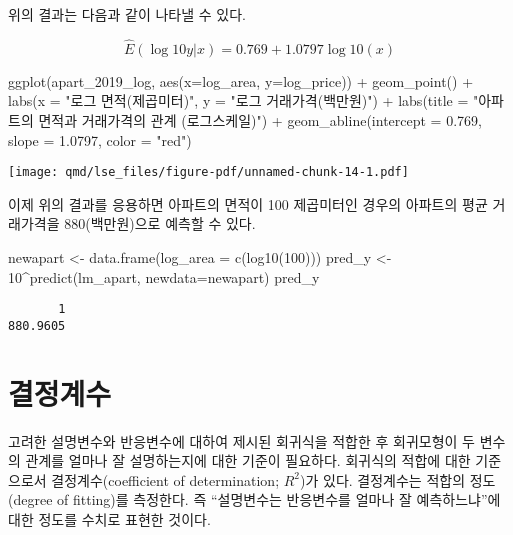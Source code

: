 \documentclass[
  11pt,
  a4paper,
  oneside]{scrbook}
\newenvironment{Shaded}{\begin{snugshade}}{\end{snugshade}}
\newcommand{\AttributeTok}[1]{\textcolor[rgb]{0.40,0.45,0.13}{#1}}
\newcommand{\DecValTok}[1]{\textcolor[rgb]{0.68,0.00,0.00}{#1}}
\newcommand{\FloatTok}[1]{\textcolor[rgb]{0.68,0.00,0.00}{#1}}
\newcommand{\FunctionTok}[1]{\textcolor[rgb]{0.28,0.35,0.67}{#1}}
\newcommand{\NormalTok}[1]{\textcolor[rgb]{0.00,0.23,0.31}{#1}}
\newcommand{\OtherTok}[1]{\textcolor[rgb]{0.00,0.23,0.31}{#1}}
\newcommand{\SpecialCharTok}[1]{\textcolor[rgb]{0.37,0.37,0.37}{#1}}
\newcommand{\StringTok}[1]{\textcolor[rgb]{0.13,0.47,0.30}{#1}}
\theoremstyle{definition}
\theoremstyle{plain}
\theoremstyle{definition}
\theoremstyle{definition}
\theoremstyle{remark}
\begin{document}
위의 결과는 다음과 같이 나타낼 수 있다.

\[ \hat E( \log10 y | x) = 0.769 + 1.0797 \log10 (x) \]

\begin{Shaded}
\begin{Highlighting}[]
\FunctionTok{ggplot}\NormalTok{(apart\_2019\_log, }\FunctionTok{aes}\NormalTok{(}\AttributeTok{x=}\NormalTok{log\_area, }\AttributeTok{y=}\NormalTok{log\_price)) }\SpecialCharTok{+} \FunctionTok{geom\_point}\NormalTok{() }\SpecialCharTok{+} \FunctionTok{labs}\NormalTok{(}\AttributeTok{x =} \StringTok{"로그 면적(제곱미터)"}\NormalTok{, }\AttributeTok{y =} \StringTok{"로그 거래가격(백만원)"}\NormalTok{) }\SpecialCharTok{+}
  \FunctionTok{labs}\NormalTok{(}\AttributeTok{title =} \StringTok{"아파트의 면적과 거래가격의 관계 (로그스케일)"}\NormalTok{) }\SpecialCharTok{+} 
  \FunctionTok{geom\_abline}\NormalTok{(}\AttributeTok{intercept =} \FloatTok{0.769}\NormalTok{, }\AttributeTok{slope =} \FloatTok{1.0797}\NormalTok{, }\AttributeTok{color =} \StringTok{"red"}\NormalTok{)}
\end{Highlighting}
\end{Shaded}

\texttt{[image: qmd/lse\_files/figure-pdf/unnamed-chunk-14-1.pdf]}

이제 위의 결과를 응용하면 아파트의 면적이 100 제곱미터인 경우의 아파트의
평균 거래가격을 880(백만원)으로 예측할 수 있다.

\begin{Shaded}
\begin{Highlighting}[]
\NormalTok{newapart }\OtherTok{\textless{}{-}} \FunctionTok{data.frame}\NormalTok{(}\AttributeTok{log\_area =} \FunctionTok{c}\NormalTok{(}\FunctionTok{log10}\NormalTok{(}\DecValTok{100}\NormalTok{)))}
\NormalTok{pred\_y }\OtherTok{\textless{}{-}} \DecValTok{10}\SpecialCharTok{\^{}}\FunctionTok{predict}\NormalTok{(lm\_apart, }\AttributeTok{newdata=}\NormalTok{newapart)}
\NormalTok{pred\_y}
\end{Highlighting}
\end{Shaded}

\begin{verbatim}
       1 
880.9605 
\end{verbatim}

\section{결정계수}\label{uxacb0uxc815uxacc4uxc218}

고려한 설명변수와 반응변수에 대하여 제시된 회귀식을 적합한 후 회귀모형이
두 변수의 관계를 얼마나 잘 설명하는지에 대한 기준이 필요하다. 회귀식의
적합에 대한 기준으로서 결정계수(coefficient of determination; \(R^2\))가
있다. 결정계수는 적합의 정도(degree of fitting)를 측정한다. 즉
``설명변수는 반응변수를 얼마나 잘 예측하느냐''에 대한 정도를 수치로
표현한 것이다.
\end{document}
